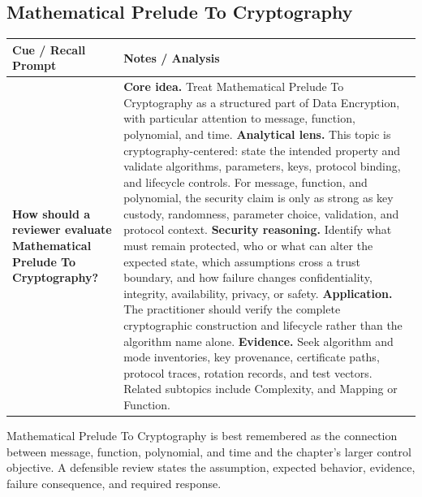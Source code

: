 \documentclass[11pt]{article}
\newcommand{\CornellHeader}{%
\rowcolor{Navy}\color{white}\bfseries Cue / Recall Prompt & \color{white}\bfseries Notes / Analysis\\\hline}
\newcommand{\CornellRow}[2]{%
\cellcolor{CueGray}\RaggedRight\textbf{#1} & \RaggedRight #2\\\hline}
\begin{document}
\subsection*{Mathematical Prelude To Cryptography}
\begin{longtable}{>{\RaggedRight\arraybackslash}p{}|>{\RaggedRight\arraybackslash}p{}}
\CornellHeader
\CornellRow{How should a reviewer evaluate Mathematical Prelude To Cryptography?}{\textbf{Core idea.} Treat Mathematical Prelude To Cryptography as a structured part of Data Encryption, with particular attention to message, function, polynomial, and time. \textbf{Analytical lens.} This topic is cryptography-centered: state the intended property and validate algorithms, parameters, keys, protocol binding, and lifecycle controls. For message, function, and polynomial, the security claim is only as strong as key custody, randomness, parameter choice, validation, and protocol context. \textbf{Security reasoning.} Identify what must remain protected, who or what can alter the expected state, which assumptions cross a trust boundary, and how failure changes confidentiality, integrity, availability, privacy, or safety. \textbf{Application.} The practitioner should verify the complete cryptographic construction and lifecycle rather than the algorithm name alone. \textbf{Evidence.} Seek algorithm and mode inventories, key provenance, certificate paths, protocol traces, rotation records, and test vectors. Related subtopics include Complexity, and Mapping or Function.}
\end{longtable}
\begin{topicsummary}
Mathematical Prelude To Cryptography is best remembered as the connection between message, function, polynomial, and time and the chapter's larger control objective. A defensible review states the assumption, expected behavior, evidence, failure consequence, and required response.
\end{topicsummary}
\end{document}
